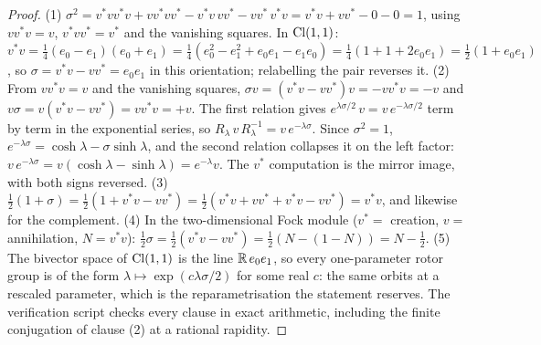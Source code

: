 \begin{proof}
(1) $\sigma^2 = v^*vv^*v + vv^*vv^* - v^*v\,vv^* - vv^*\,v^*v = v^*v + vv^* - 0 - 0 = 1$, using $vv^*v = v$, $v^*vv^* = v^*$ and the vanishing squares. In $\mathrm{Cl}(1,1)$: $v^*v = \tfrac14(e_0 - e_1)(e_0 + e_1) = \tfrac14(e_0^2 - e_1^2 + e_0e_1 - e_1e_0) = \tfrac14(1 + 1 + 2e_0e_1) = \tfrac12(1 + e_0e_1)$, so $\sigma = v^*v - vv^* = e_0e_1$ in this orientation; relabelling the pair reverses it. (2) From $vv^*v = v$ and the vanishing squares, $\sigma v = (v^*v - vv^*)v = -vv^*v = -v$ and $v\sigma = v(v^*v - vv^*) = vv^*v = +v$. The first relation gives $e^{\lambda\sigma/2}\,v = v\,e^{-\lambda\sigma/2}$ term by term in the exponential series, so $R_\lambda\, v\, R_\lambda^{-1} = v\,e^{-\lambda\sigma}$. Since $\sigma^2 = 1$, $e^{-\lambda\sigma} = \cosh\lambda - \sigma\sinh\lambda$, and the second relation collapses it on the left factor: $v\,e^{-\lambda\sigma} = v(\cosh\lambda - \sinh\lambda) = e^{-\lambda}v$. The $v^*$ computation is the mirror image, with both signs reversed. (3) $\tfrac12(1 + \sigma) = \tfrac12(1 + v^*v - vv^*) = \tfrac12(v^*v + vv^* + v^*v - vv^*) = v^*v$, and likewise for the complement. (4) In the two-dimensional Fock module ($v^* = $ creation, $v = $ annihilation, $N = v^*v$): $\tfrac12\sigma = \tfrac12(v^*v - vv^*) = \tfrac12(N - (1 - N)) = N - \tfrac12$. (5) The bivector space of $\mathrm{Cl}(1,1)$ is the line $\mathbb{R}\,e_0e_1$, so every one-parameter rotor group is of the form $\lambda \mapsto \exp(c\lambda\sigma/2)$ for some real $c$: the same orbits at a rescaled parameter, which is the reparametrisation the statement reserves. The verification script checks every clause in exact arithmetic, including the finite conjugation of clause (2) at a rational rapidity.
\end{proof}

